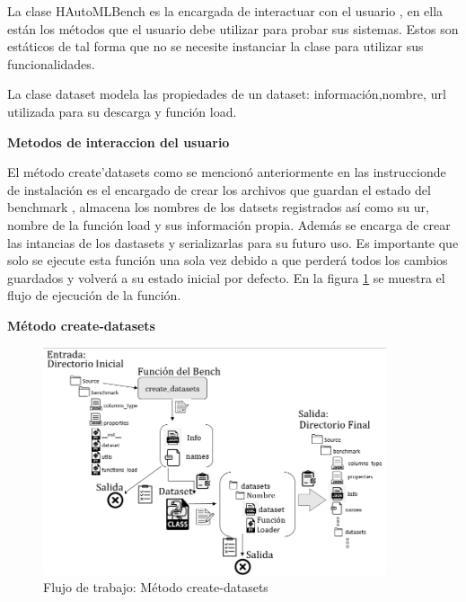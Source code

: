 La clase HAutoMLBench es la encargada de interactuar con el usuario , en ella están los métodos que el usuario debe utilizar para 
probar sus sistemas. Estos son estáticos de tal forma que no se necesite instanciar la clase para utilizar sus funcionalidades.

La clase dataset modela las propiedades de un dataset: información,nombre, url utilizada para su descarga y función load.

\begin{flushleft} 
    {\large { \textbf{ Metodos de interaccion del usuario }}}\label{section:methods}
\end{flushleft}


El método create'datasets como se mencionó anteriormente en las instruccionde de instalación es el encargado de crear los archivos que guardan el estado del benchmark
, almacena los nombres de los datsets registrados así como su ur, nombre de la función load y sus información propia. Además se encarga de crear las intancias de los dastasets y 
serializarlas para su futuro uso. Es importante que solo se ejecute esta función una sola vez debido a que perderá todos los cambios guardados y volverá a su estado inicial por defecto.
En la figura \ref{fig:image2} se muestra el flujo de ejecución de la función. 

\begin{flushleft} 
    { \textbf{ Método create-datasets }}\label{section:create}
\end{flushleft}

\begin{figure}[H]
    \centering
    \includegraphics[width=0.9\textwidth]{Graphics/methods/create-datasets.png}
    \caption{Flujo de trabajo: Método create-datasets}
    \label{fig:image2}
 \end{figure}

